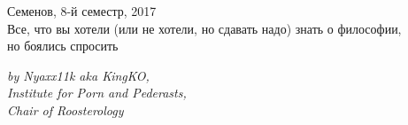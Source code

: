 

\begin{titlepage}
\par 
\vspace*{-2cm}
\begin{center}
{\sf \Large
\vspace*{1.5cm}
{\Huge Семенов, 8-й семестр, 2017}\\
{ Все, что вы хотели {\small(или не хотели, но сдавать надо)} знать о философии,\\ но боялись спросить}}\\
\vspace*{2cm}
\begin{flushright}
\sl\small
by Nyaxx11k aka KingKO,\\
Institute for Porn and Pederasts,\\
Chair of Roosterology
\end{flushright}
\end{center}
\end{titlepage}
\topmargin -1cm 
\hoffset -0.7in 
\textwidth 6.0in 
\textheight 9.0in 
\normalsize 
{}
\tableofcontents
\pagebreak

